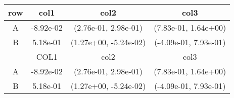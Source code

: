 \begin{tabular}{cccc}
\toprule
row&col1&col2&col3\tabularnewline
\midrule
A&-8.92e-02& (2.76e-01, 2.98e-01)& (7.83e-01, 1.64e+00)\tabularnewline
B&5.18e-01& (1.27e+00, -5.24e-02)& (-4.09e-01, 7.93e-01)\tabularnewline
\midrule
&COL1&col2&col3\tabularnewline
\midrule
A&-8.92e-02& (2.76e-01, 2.98e-01)& (7.83e-01, 1.64e+00)\tabularnewline
B&5.18e-01& (1.27e+00, -5.24e-02)& (-4.09e-01, 7.93e-01)\tabularnewline
\bottomrule
\end{tabular}
